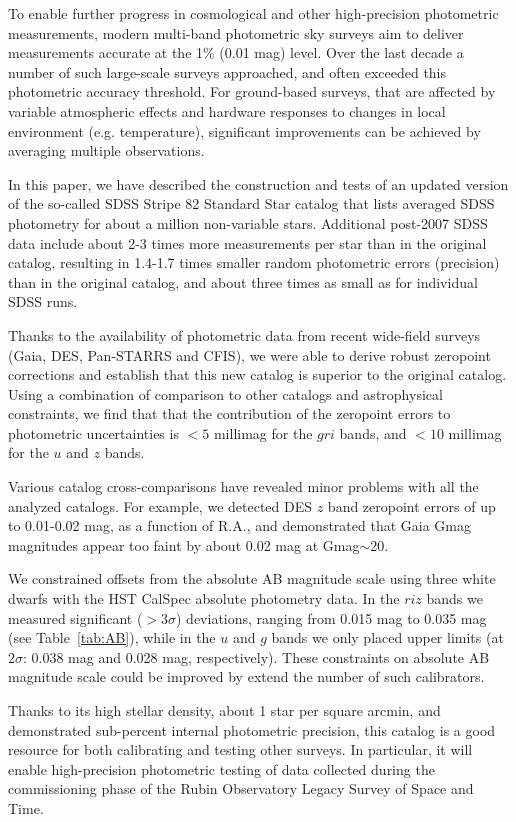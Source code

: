 \documentclass{aastex63}
\begin{document}
To enable further progress in cosmological and other high-precision photometric measurements, 
modern multi-band photometric sky surveys aim to deliver measurements accurate at the 1\% 
(0.01 mag) level. Over the last decade a number of such large-scale surveys approached, and
often exceeded this photometric accuracy threshold. For ground-based surveys, that are 
affected by variable atmospheric effects and hardware responses to changes in local environment
(e.g. temperature), significant improvements can be achieved by averaging multiple observations. 

In this paper, we have described the construction and tests of an updated version of the so-called
SDSS Stripe 82 Standard Star catalog \citep{Ivez07} that lists averaged SDSS photometry for about
a million non-variable stars. Additional post-2007 SDSS data include about 
2-3 times more measurements per star than in the original catalog, resulting in 1.4-1.7 times smaller 
random photometric errors (precision) than in the original catalog, and about three times as small 
as for individual SDSS runs.

Thanks to the availability of photometric data from recent wide-field surveys (Gaia, DES, Pan-STARRS
and CFIS), we were able to derive robust zeropoint corrections and establish that this new catalog
is superior to the original catalog. Using a combination of comparison to other catalogs and 
astrophysical constraints, we find that that the contribution of the zeropoint errors to photometric
uncertainties is $<5$ millimag for the $gri$ bands, and $<10$ millimag for the $u$ and $z$ bands. 

Various catalog cross-comparisons have revealed minor problems with all the analyzed catalogs.
For example, we detected DES $z$ band zeropoint errors of up to 0.01-0.02 mag, as a function 
of R.A., and demonstrated that Gaia Gmag magnitudes appear too faint by about 0.02 mag at
Gmag$\sim$20.
 
We constrained offsets from the absolute AB magnitude scale using three white dwarfs with the 
HST CalSpec absolute photometry data. In the $riz$ bands we measured significant ($>3\sigma$) 
deviations, ranging from 0.015 mag to 0.035 mag (see Table~\ref{tab:AB}), while in the $u$ and $g$ 
bands we only placed upper limits (at $2\sigma$: 0.038 mag and 0.028 mag, respectively). These
constraints on absolute AB magnitude scale could be improved by extend the number of such 
calibrators.

Thanks to its high stellar density, about 1 star per square arcmin, and demonstrated sub-percent 
internal photometric precision, this catalog is a good resource for both calibrating and testing 
other surveys. In particular, it will enable high-precision photometric testing of data collected 
during the commissioning phase of the Rubin Observatory Legacy Survey of Space and Time. 
  
\end{document}

